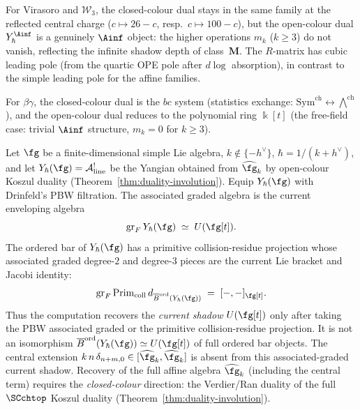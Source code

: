 \begin{construction}
For Virasoro and $\mathcal{W}_3$, the closed-colour dual
stays in the same family at the reflected central charge
($c \mapsto 26 - c$, resp.\ $c \mapsto 100 - c$), but
the open-colour dual $Y^{\Ainf}_\hbar$ is a genuinely
$\Ainf$ object: the higher operations $m_k$ ($k \ge 3$)
do not vanish, reflecting the infinite shadow depth of
class~$\mathbf{M}$. The $R$-matrix has cubic leading
pole (from the quartic OPE pole after $d\log$ absorption),
in contrast to the simple leading pole for the affine
families.

For $\beta\gamma$, the closed-colour dual is the $bc$
system (statistics exchange: $\mathrm{Sym}^{\mathrm{ch}}
\leftrightarrow \bigwedge^{\mathrm{ch}}$), and the
open-colour dual reduces to the polynomial ring $\Bbbk[t]$
(the free-field case: trivial $\Ainf$ structure, $m_k = 0$
for $k \ge 3$).

\begin{proposition}
\label{prop:open-colour-double-bar}%
%
Let $\fg$ be a finite-dimensional simple Lie algebra,
$k\notin\{-h^\vee\}$, $\hbar=1/(k{+}h^\vee)$, and let
$Y_\hbar(\fg)=\cA^!_{\mathrm{line}}$ be the Yangian obtained
from $\widehat{\fg}_k$ by open-colour Koszul duality
\textup{(Theorem~\ref{thm:duality-involution})}.
Equip \(Y_\hbar(\fg)\) with Drinfeld's PBW filtration.  The
associated graded algebra is the current enveloping algebra
\[
\operatorname{gr}_F Y_\hbar(\fg)
\;\simeq\;
U(\fg[t]).
\]
The ordered bar of \(Y_\hbar(\fg)\) has a primitive collision-residue
projection whose associated graded degree-\(2\) and degree-\(3\)
pieces are the current Lie bracket and Jacobi identity:
\[
 \operatorname{gr}_F
 \operatorname{Prim}_{\mathrm{coll}}
 d_{\Barchord(Y_\hbar(\fg))}
 \;=\;
 [-,-]_{\fg[t]} .
\]
Thus the computation recovers the \emph{current shadow}
\(U(\fg[t])\) only after taking the PBW associated graded or the
primitive collision-residue projection.  It is not an isomorphism
\(\Barchord(Y_\hbar(\fg))\simeq U(\fg[t])\) of full ordered bar
objects.
The central extension
$k\,n\,\delta_{n+m,0}\in[\widehat{\fg}_k,\widehat{\fg}_k]$
is absent from this associated-graded current shadow.
Recovery of the full affine algebra $\widehat{\fg}_k$
\textup{(}including the central term\textup{)} requires the
\emph{closed-colour} direction: the Verdier\slash Ran duality of
the full $\SCchtop$ Koszul duality
\textup{(Theorem~\ref{thm:duality-involution})}.
\end{proposition}


\end{construction}
